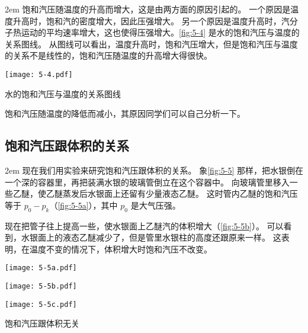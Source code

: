\medskip\noindent
\begin{minipage}{0.48\linewidth}\parindent2em
饱和汽压随温度的升高而增大，这是由两方面的原因引起的。
一个原因是温度升高时，饱和汽的密度增大，因此压强增大。
另一个原因是温度升高时，汽分子热运动的平均速率增大，这也使得压强增大。\cref{fig:5-4} 是水的饱和汽压与温度的关系图线。
从图线可以看出，温度升高时，饱和汽压增大，但是饱和汽压与温度的关系不是线性的，饱和汽压随温度的升高增大得很快。
\end{minipage}\hfill
\begin{minipage}{0.48\linewidth}\centering
\begin{figurehere}
	\texttt{[image: 5-4.pdf]}
\caption{水的饱和汽压与温度的关系图线}\label{fig:5-4}
\end{figurehere}
\end{minipage}

\medskip
饱和汽压随温度的降低而减小，其原因同学们可以自己分析一下。

\subsection{饱和汽压跟体积的关系} 

\medskip\noindent
\begin{minipage}{0.62\linewidth}\parindent2em
现在我们用实验来研究饱和汽压跟体积的关系。
象\cref{fig:5-5} 那样，把水银倒在一个深的容器里，再把装满水银的玻璃管倒立在这个容器中。
向玻璃管里移入一些乙醚，使乙醚蒸发后水银面上还留有少量液态乙醚。
这时管内乙醚的饱和汽压等于 $p_0-p_k$（\cref{fig:5-5a}），其中 $p_0$ 是大气压强。

现在把管子往上提高一些，使水银面上乙醚汽的体积增大（\cref{fig:5-5b}）。
可以看到，水银面上的液态乙醚减少了，但是管里水银柱的高度还跟原来一样。
这表明，在温度不变的情况下，体积增大时饱和汽压不改变。
\end{minipage}\hfill
\begin{minipage}{0.34\linewidth}\centering
\begin{figurehere}
  \nextfloat
  \begin{minipage}[b]{0.42\linewidth}\centering
    \texttt{[image: 5-5a.pdf]}
    \subcaption{}\label{fig:5-5a}
  \end{minipage}%
  \begin{minipage}[b]{0.27\linewidth}\centering
    \texttt{[image: 5-5b.pdf]}
    \subcaption{}\label{fig:5-5b}
  \end{minipage}%
  \begin{minipage}[b]{0.27\linewidth}\centering
    \texttt{[image: 5-5c.pdf]}
    \subcaption{}\label{fig:5-5c}
  \end{minipage}
  \caption{饱和汽压跟体积无关}\label{fig:5-5}
\end{figurehere}
\end{minipage}

